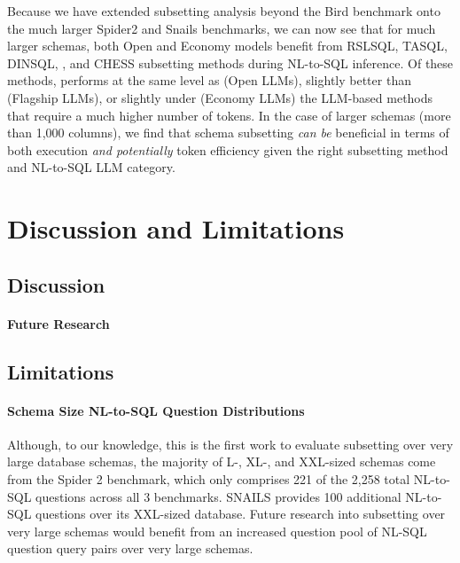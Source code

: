 Because we have extended subsetting analysis beyond the Bird benchmark onto the much larger Spider2 and Snails benchmarks, we can now see that for much larger schemas, both Open and Economy models benefit from RSLSQL, TASQL, DINSQL, \PROJECTNAME, and CHESS subsetting methods during NL-to-SQL inference.
Of these methods, \PROJECTNAME{ }performs at the same level as (Open LLMs), slightly better than (Flagship LLMs), or slightly under (Economy LLMs) the LLM-based methods that require a much higher number of tokens.
In the case of larger schemas (more than 1,000 columns), we find that schema subsetting \emph{can be} beneficial in terms of both execution \emph{and potentially} token efficiency given the right subsetting method and NL-to-SQL LLM category.




\section{Discussion and Limitations}


\subsection{Discussion}

\paragraph{\textbf{Future Research}}
\subsection{Limitations}

\paragraph{\textbf{Schema Size NL-to-SQL Question Distributions}}
Although, to our knowledge, this is the first work to evaluate subsetting over very large database schemas, the majority of L-, XL-, and XXL-sized schemas come from the Spider 2 benchmark, which only comprises 221 of the 2,258 total NL-to-SQL questions across all 3 benchmarks.
SNAILS provides 100 additional NL-to-SQL questions over its XXL-sized database.
Future research into subsetting over very large schemas would benefit from an increased question pool of NL-SQL question query pairs over very large schemas.

